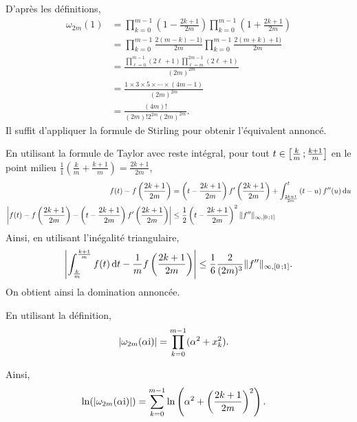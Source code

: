 \begin{solution}
\begin{reponses}
\item D'après les définitions,
\begin{align*}
\omega_{2m}(1)
&= \prod_{k=0}^{m-1} \left(1 - \frac{2 k + 1}{2m}\right) \prod_{k=0}^{m-1} \left(1 + \frac{2 k + 1}{2 m}\right)\\
&= \prod_{k=0}^{m-1} \frac{2 (m - k) - 1)}{2 m} \prod_{k=0}^{m-1} \frac{2 (m + k) + 1)}{2 m}\\
&= \frac{\prod_{\ell=0}^{m-1} (2 \ell + 1) \prod_{\ell=m}^{2m-1} (2 \ell + 1)}{(2 m)^{2m}}\\
&= \frac{1 \times 3 \times 5 \times \cdots \times (4 m - 1)}{(2 m)^{2m}}\\
&= \frac{(4 m)!}{(2 m)! 2^{2m} (2 m)^{2 m}}.
\end{align*}
Il suffit d'appliquer la formule de Stirling pour obtenir l'équivalent annoncé.

\item En utilisant la formule de Taylor avec reste intégral, pour tout $t \in \left[\frac{k}{m}\,;\frac{k+1}{m}\right]$ en le point milieu $\frac{1}{1}\left(\frac{k}{m} + \frac{k+1}{m}\right) = \frac{2 k + 1}{2m}$,
\begin{align*}
f(t) - f\left(\frac{2k+1}{2m}\right)
&= \left(t - \frac{2 k + 1}{2 m}\right) f'\left(\frac{2k+1}{2m}\right) + \int_{\frac{2k+1}{2m}}^{t} \left(t - u\right) f''(u) \, \mathrm{d} u\\
\mathopen{}\left| f(t) - f\left(\frac{2k+1}{2m}\right) - \left(t - \frac{2 k + 1}{2 m}\right) f'\left(\frac{2k+1}{2m}\right) \right| &\leq \frac{1}{2} \left(t - \frac{2 k + 1}{2m}\right)^2  \Vert f'' \Vert_{\infty,\left[0\,;1\right]} \\
\end{align*}
Ainsi, en utilisant l'inégalité triangulaire,
\begin{align*}
\mathopen{}\left| \int_{\frac{k}{m}}^{\frac{k+1}{m}} f(t) \, \mathrm{d} t - \frac{1}{m} f\left(\frac{2 k +1}{2m}\right) \right| \leq \frac{1}{6} \frac{2}{(2m)^3} \Vert f'' \Vert_{\infty, \left[0\,;1\right]}.
\end{align*}
On obtient ainsi la domination annoncée.

\item En utilisant la définition,
\begin{align*}
\mathopen{}\left| \omega_{2m}(\alpha \mathrm{i}) \right|
&= \prod_{k=0}^{m-1} (\alpha^2 + x_k^2).
\end{align*}

Ainsi,
\begin{align*}
\ln(\mathopen{}\left| \omega_{2m}(\alpha \mathrm{i}) \right|)
&= \sum_{k=0}^{m-1} \ln\left(\alpha^2 + \left(\frac{2 k + 1}{2m}\right)^2\right).
\end{align*}


\end{reponses}
\end{solution}
